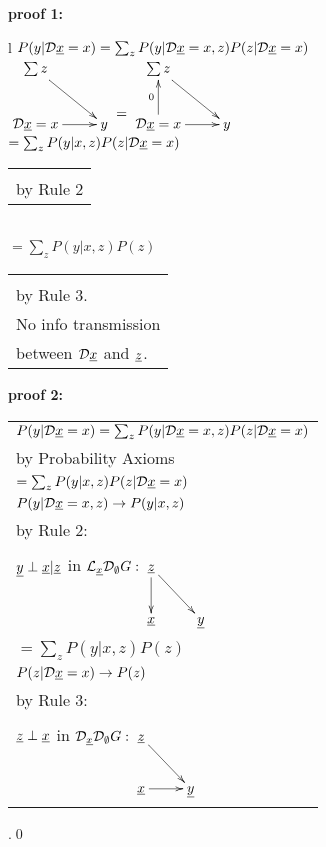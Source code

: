 \proof

{\bf * proof 1:}
\begin{longtable}{l}
\color{red}
$P(y|{\cal D}{\underline{x}}=x)=\sum_z
 P(y|{\cal D} {\underline{x}}=x, z)P(z|{\cal D}{\underline{x}} =x)$
\\
$\xymatrix{
\sum z\ar[dr]
\\
\cald \rvx=x\ar[r]
&y
}
\xymatrix{\\=}
\xymatrix{
\sum z\ar[dr]
\\
\cald \rvx=x\ar[r]\ar[u]^0
&y
}
$
\\
\color{red}
$=\sum_z P(y|x,z)P(z|{\cal D}{\underline{x}}=x)$
\\
\xymatrix{\\=}
\begin{tabular}{l}
\\
\\
by Rule 2
\end{tabular}
\\
\color{red}
$=\sum_z P(y|x,z)P(z)$
\\
\xymatrix{\\
=}
\begin{tabular}{l}\\
\\
by Rule 3.
\\
No info transmission\\
between ${\cal D}{\underline{x}}$ and ${\underline{z}}$.
\end{tabular}
\end{longtable}


{\bf * proof 2:}
\begin{longtable}{l}
\color{red}
$P(y|{\cal D}{\underline{x}}=x)
=
\sum_z
P(y|{\cal D}{\underline{x}}=x, z)
P(z|{\cal D}{\underline{x}}=x)$
\\
\quad by Probability Axioms
\\
\color{red}
$=\sum_z
P(y|x, z)
P(z|{\cal D}{\underline{x}}=x)$
\\
\quad $P(y|{\cal D} {\underline{x}}=x, z)\rightarrow
P(y|x, z)$
\\
\quad  by Rule 2:
\begin{tabular}{l}
\\
\end{tabular}
\\
\quad 
${\underline{y}}\perp{\underline{x}}|{\underline{z}}$ in 
$\call_\rvx\cald_\emptyset G:
\xymatrix{
\rvz\ar[d]\ar[rd]
\\
\rvx
&\rvy
}$
\\
\color{red}
$=\sum_z
P(y|x, z)
P(z)$
\\
\quad $P(z|{\cal D} {\underline{x}}=x)\rightarrow
P(z)$
\\
\quad  by Rule 3: 
\begin{tabular}{l}
\\
\end{tabular}
\\
\quad
${\underline{z}}\perp {\underline{x}}$ in
$\cald_\rvx \cald_\emptyset G:
\xymatrix{
\rvz\ar[rd]
\\
\rvx\ar[r]
&\rvy
}
$
\end{longtable}
.\qed



